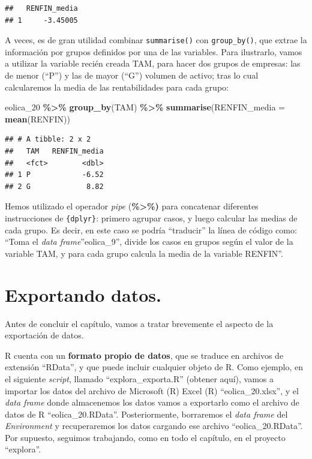 \documentclass[
]{book}
\newenvironment{Shaded}{\begin{snugshade}}{\end{snugshade}}
\newcommand{\AttributeTok}[1]{\textcolor[rgb]{0.13,0.29,0.53}{#1}}
\newcommand{\FunctionTok}[1]{\textcolor[rgb]{0.13,0.29,0.53}{\textbf{#1}}}
\newcommand{\NormalTok}[1]{#1}
\newcommand{\SpecialCharTok}[1]{\textcolor[rgb]{0.81,0.36,0.00}{\textbf{#1}}}
\begin{document}
\begin{verbatim}
##   RENFIN_media
## 1     -3.45005
\end{verbatim}

A veces, es de gran utilidad combinar \texttt{summarise()} con \texttt{group\_by()}, que extrae la información por grupos definidos por una de las variables. Para ilustrarlo, vamos a utilizar la variable recién creada TAM, para hacer dos grupos de empresas: las de menor (``P'') y las de mayor (``G'') volumen de activo; tras lo cual calcularemos la media de las rentabilidades para cada grupo:

\begin{Shaded}
\begin{Highlighting}[]
\NormalTok{eolica\_20 }\SpecialCharTok{\%\textgreater{}\%}  \FunctionTok{group\_by}\NormalTok{(TAM) }\SpecialCharTok{\%\textgreater{}\%} \FunctionTok{summarise}\NormalTok{(}\AttributeTok{RENFIN\_media =} \FunctionTok{mean}\NormalTok{(RENFIN))}
\end{Highlighting}
\end{Shaded}

\begin{verbatim}
## # A tibble: 2 x 2
##   TAM   RENFIN_media
##   <fct>        <dbl>
## 1 P            -6.52
## 2 G             8.82
\end{verbatim}

Hemos utilizado el operador \emph{pipe} (\textbf{\%\textgreater\%)} para concatenar diferentes instrucciones de \texttt{\{dplyr\}}: primero agrupar casos, y luego calcular las medias de cada grupo. Es decir, en este caso se podría ``traducir'' la línea de código como: ``Toma el \emph{data frame}''eolica\_9'', divide los casos en grupos según el valor de la variable TAM, y para cada grupo calcula la media de la variable RENFIN''.

\section{Exportando datos.}\label{exportando-datos.}

Antes de concluir el capítulo, vamos a tratar brevemente el aspecto de la exportación de datos.

R cuenta con un \textbf{formato propio de datos}, que se traduce en archivos de extensión ``RData'', y que puede incluir cualquier objeto de R. Como ejemplo, en el siguiente \emph{script}, llamado ``explora\_exporta.R'' (obtener aquí), vamos a importar los datos del archivo de Microsoft (R) Excel (R) ``eolica\_20.xlsx'', y el \emph{data frame} donde almacenemos los datos vamos a exportarlo como el archivo de datos de R ``eolica\_20.RData''. Posteriormente, borraremos el \emph{data frame} del \emph{Environment} y recuperaremos los datos cargando ese archivo ``eolica\_20.RData''. Por supuesto, seguimos trabajando, como en todo el capítulo, en el proyecto ``explora''.
\end{document}
